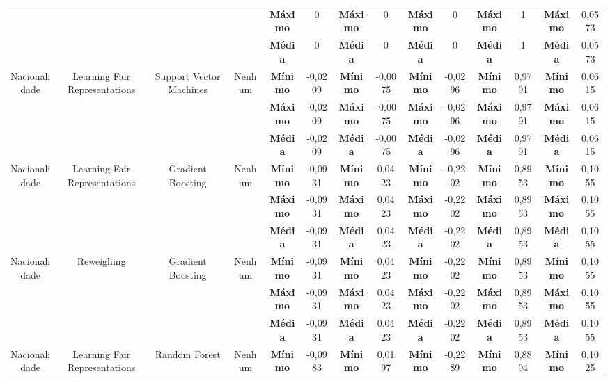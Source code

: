 \documentclass[portugues]{ic-tese}
\begin{document}
\begin{table}[H]
\begin{center}
{\begin{tabular}{c|c|c|c|c|c|c|c|c|c|c|c|c|c}
             & & & & \textbf{Máximo} & 0 & \textbf{Máximo} & 0 & \textbf{Máximo} & 0 & \textbf{Máximo} & 1 & \textbf{Máximo} & 0,0573 \\
             & & & & \textbf{Média} & 0 & \textbf{Média} & 0 & \textbf{Média} & 0 & \textbf{Média} & 1 & \textbf{Média} & 0,0573 \\
            \hline
            \multirow{3}{*}{Nacionalidade} & \multirow{3}{*}{Learning Fair Representations} & \multirow{3}{*}{Support Vector Machines} & \multirow{3}{*}{Nenhum} & \textbf{Mínimo} & -0,0209 & \textbf{Mínimo} & -0,0075 & \textbf{Mínimo} & -0,0296 & \textbf{Mínimo} & 0,9791 & \textbf{Mínimo} & 0,0615 \\
             & & & & \textbf{Máximo} & -0,0209 & \textbf{Máximo} & -0,0075 & \textbf{Máximo} & -0,0296 & \textbf{Máximo} & 0,9791 & \textbf{Máximo} & 0,0615 \\
             & & & & \textbf{Média} & -0,0209 & \textbf{Média} & -0,0075 & \textbf{Média} & -0,0296 & \textbf{Média} & 0,9791 & \textbf{Média} & 0,0615 \\
            \hline
            \multirow{3}{*}{Nacionalidade} & \multirow{3}{*}{Learning Fair Representations} & \multirow{3}{*}{Gradient Boosting} & \multirow{3}{*}{Nenhum} & \textbf{Mínimo} & -0,0931 & \textbf{Mínimo} & 0,0423 & \textbf{Mínimo} & -0,2202 & \textbf{Mínimo} & 0,8953 & \textbf{Mínimo} & 0,1055 \\
             & & & & \textbf{Máximo} & -0,0931 & \textbf{Máximo} & 0,0423 & \textbf{Máximo} & -0,2202 & \textbf{Máximo} & 0,8953 & \textbf{Máximo} & 0,1055 \\
             & & & & \textbf{Média} & -0,0931 & \textbf{Média} & 0,0423 & \textbf{Média} & -0,2202 & \textbf{Média} & 0,8953 & \textbf{Média} & 0,1055 \\
            \hline
            \multirow{3}{*}{Nacionalidade} & \multirow{3}{*}{Reweighing} & \multirow{3}{*}{Gradient Boosting} & \multirow{3}{*}{Nenhum} & \textbf{Mínimo} & -0,0931 & \textbf{Mínimo} & 0,0423 & \textbf{Mínimo} & -0,2202 & \textbf{Mínimo} & 0,8953 & \textbf{Mínimo} & 0,1055 \\
             & & & & \textbf{Máximo} & -0,0931 & \textbf{Máximo} & 0,0423 & \textbf{Máximo} & -0,2202 & \textbf{Máximo} & 0,8953 & \textbf{Máximo} & 0,1055 \\
             & & & & \textbf{Média} & -0,0931 & \textbf{Média} & 0,0423 & \textbf{Média} & -0,2202 & \textbf{Média} & 0,8953 & \textbf{Média} & 0,1055 \\
            \hline
            \multirow{3}{*}{Nacionalidade} & \multirow{3}{*}{Learning Fair Representations} & \multirow{3}{*}{Random Forest} & \multirow{3}{*}{Nenhum} & \textbf{Mínimo} & -0,0983 & \textbf{Mínimo} & 0,0197 & \textbf{Mínimo} & -0,2289 & \textbf{Mínimo} & 0,8894 & \textbf{Mínimo} & 0,1025 \\

\end{tabular}}
\end{center}
\end{table}
\end{document}
